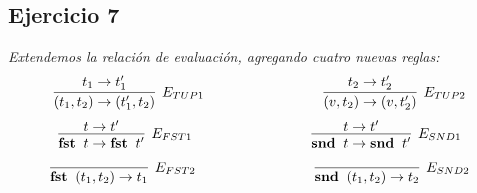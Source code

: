 \documentclass[a4paper,10pt]{article}
\begin{document}
\pagebreak
\subsection*{Ejercicio 7} 
	\emph{Extendemos la relación de evaluación, agregando cuatro nuevas reglas:}
	\\
	\begin{align*}
		\infer[E_{TUP1}]{
			(t_{1},t_{2}) \rightarrow (t_{1}',t_{2})
		}{
			t_{1} \rightarrow t_{1}'
		} \hspace{3cm}
		\infer[E_{TUP2}]{
			(v,t_{2}) \rightarrow (v,t_{2}')
		}{
			t_{2} \rightarrow t_{2}'
		}
	\end{align*}
	\begin{align*}
		\infer[E_{FST1}]{
			{\bf fst}\;\;t \rightarrow {\bf fst}\;\;t'
		}{
			t \rightarrow t'
		} \hspace{3cm}
		\infer[E_{SND1}]{
			{\bf snd}\;\;t \rightarrow {\bf snd}\;\;t'
		}{
			t \rightarrow t'
		}
	\end{align*}
	\begin{align*}
		\infer[E_{FST2}]{
			{\bf fst}\;\;(t_{1},t_{2}) \rightarrow t_{1}
		}{
		} \hspace{3cm}
		\infer[E_{SND2}]{
			{\bf snd}\;\;(t_{1},t_{2}) \rightarrow t_{2}
		}{
		}
	\end{align*}
	\\
	\\
	\\	
\end{document}
